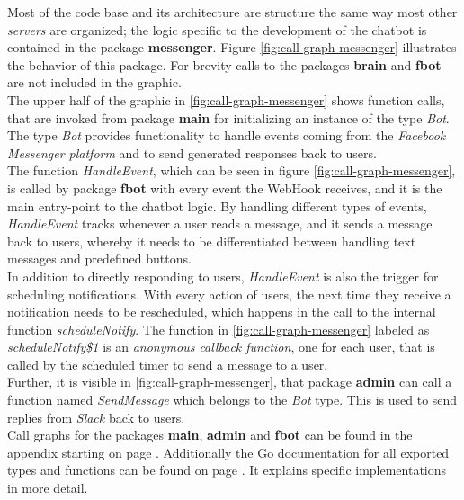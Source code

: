 Most of the code base and its architecture are structure the same way most other \emph{servers} are organized;
the logic specific to the development of the chatbot is contained in the package \textbf{messenger}.
Figure \ref{fig:call-graph-messenger} illustrates the behavior of this package.
For brevity calls to the packages \textbf{brain} and \textbf{fbot} are not included in the graphic.
\\
The upper half of the graphic in \ref{fig:call-graph-messenger} shows function calls,
that are invoked from package \textbf{main} for initializing an instance of the type \emph{Bot}.
\\
The type \emph{Bot} provides functionality to handle events coming from the \emph{Facebook Messenger platform}
and to send generated responses back to users.
\\
The function \emph{HandleEvent}, which can be seen in figure \ref{fig:call-graph-messenger},
is called by package \textbf{fbot} with every event the WebHook receives,
and it is the main entry-point to the chatbot logic.
By handling different types of events,
\emph{HandleEvent} tracks whenever a user reads a message,
and it sends a message back to users,
whereby it needs to be differentiated between handling text messages
and predefined buttons.
\\
In addition to directly responding to users,
\emph{HandleEvent} is also the trigger for scheduling notifications.
With every action of users, the next time they receive a notification needs to be rescheduled,
which happens in the call to the internal function \emph{scheduleNotify}.
The function in \ref{fig:call-graph-messenger} labeled as \emph{scheduleNotify\$1} is an \emph{anonymous callback function},
one for each user, that is called by the scheduled timer to send a message to a user.
\\
Further, it is visible in \ref{fig:call-graph-messenger},
that package \textbf{admin} can call a function named \emph{SendMessage} which belongs to the \emph{Bot} type.
This is used to send replies from \emph{Slack} back to users.
\\

Call graphs for the packages \textbf{main}, \textbf{admin} and \textbf{fbot} can be found in the appendix starting on page \pageref{a:call-graph}.
Additionally the Go documentation for all exported types and functions can be found on page \pageref{a:docs}.
It explains specific implementations in more detail.
\\

